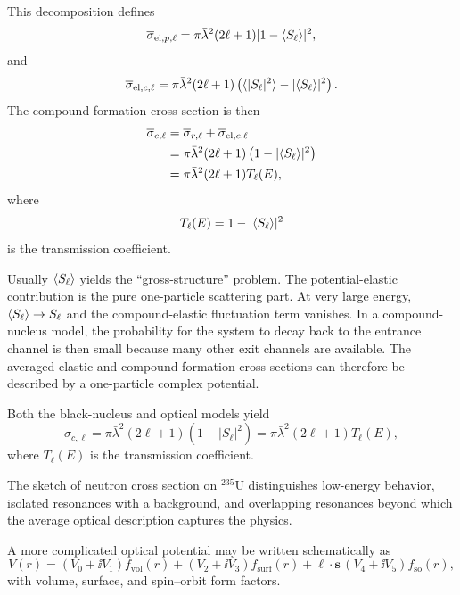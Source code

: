 This decomposition defines
\begin{equation}
  \overline\sigma_{\mathrm{el},p,\ell}
  =\pi\bar\lambda^2(2\ell+1)|1-\langle S_\ell\rangle|^2,
  \label{eq:om-potential-elastic}
\end{equation}
and
\begin{equation}
  \overline\sigma_{\mathrm{el},c,\ell}
  =\pi\bar\lambda^2(2\ell+1)
  \left(\langle |S_\ell|^2\rangle-|\langle S_\ell\rangle|^2\right).
  \label{eq:om-compound-elastic}
\end{equation}
The compound-formation cross section is then
\begin{align}
  \overline\sigma_{c,\ell}
  &=\overline\sigma_{r,\ell}
  +\overline\sigma_{\mathrm{el},c,\ell}\\
  &=\pi\bar\lambda^2(2\ell+1)
  \left(1-|\langle S_\ell\rangle|^2\right)\\
  &=\pi\bar\lambda^2(2\ell+1)T_\ell(E),
  \label{eq:om-transmission-coefficient}
\end{align}
where
\[
  T_\ell(E)=1-|\langle S_\ell\rangle|^2
\]
is the transmission coefficient.

Usually $\langle S_\ell\rangle$ yields the ``gross-structure'' problem.  The potential-elastic contribution is the pure one-particle scattering part.  At very large energy, $\langle S_\ell\rangle\to S_\ell$ and the compound-elastic fluctuation term vanishes.  In a compound-nucleus model, the probability for the system to decay back to the entrance channel is then small because many other exit channels are available.  The averaged elastic and compound-formation cross sections can therefore be described by a one-particle complex potential.

Both the black-nucleus and optical models yield
\begin{equation}
  \sigma_{c,\ell}
  =\pi\bar\lambda^2(2\ell+1)(1-|S_\ell|^2)
  =\pi\bar\lambda^2(2\ell+1)T_\ell(E),
\end{equation}
where $T_\ell(E)$ is the transmission coefficient.

The sketch of neutron cross section on $^{235}$U distinguishes low-energy behavior, isolated resonances with a background, and overlapping resonances beyond which the average optical description captures the physics.

A more complicated optical potential may be written schematically as
\[
  V(r)
  =(V_0+\ii V_1)f_{\mathrm{vol}}(r)
  +(V_2+\ii V_3)f_{\mathrm{surf}}(r)
  +\bm\ell\cdot\bm s\,(V_4+\ii V_5)f_{\mathrm{so}}(r),
\]
with volume, surface, and spin--orbit form factors.

